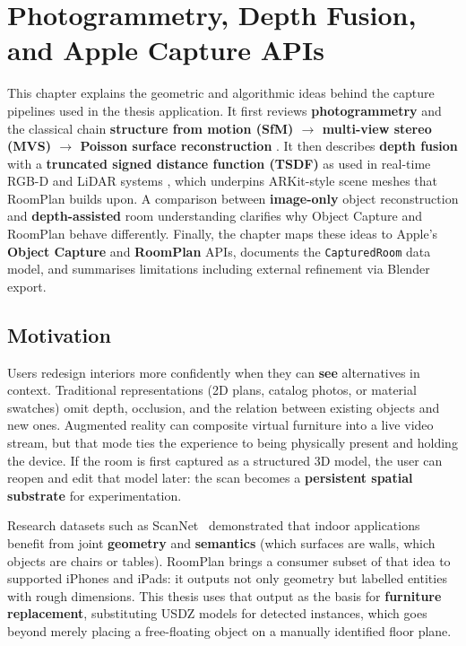 \chapter{Photogrammetry, Depth Fusion, and Apple Capture APIs}
\label{ch:theory1}

This chapter explains the geometric and algorithmic ideas behind the capture pipelines used in the thesis application. It first reviews \textbf{photogrammetry} and the classical chain \textbf{structure from motion (SfM) $\rightarrow$ multi-view stereo (MVS) $\rightarrow$ Poisson surface reconstruction} \cite{luhmann2014photogrammetry,lowe2004sift,furukawa2010pmvs,kazhdan2006poisson}. It then describes \textbf{depth fusion} with a \textbf{truncated signed distance function (TSDF)} as used in real-time RGB-D and LiDAR systems \cite{newcombe2011kinectfusion,whelan2016elasticfusion}, which underpins ARKit-style scene meshes that RoomPlan builds upon. A comparison between \textbf{image-only} object reconstruction and \textbf{depth-assisted} room understanding clarifies why Object Capture and RoomPlan behave differently. Finally, the chapter maps these ideas to Apple's \textbf{Object Capture} and \textbf{RoomPlan} APIs, documents the \texttt{CapturedRoom} data model, and summarises limitations including external refinement via Blender export.

\section{Motivation}
\label{sec:motivation}

Users redesign interiors more confidently when they can \textbf{see} alternatives in context. Traditional representations (2D plans, catalog photos, or material swatches) omit depth, occlusion, and the relation between existing objects and new ones. Augmented reality can composite virtual furniture into a live video stream, but that mode ties the experience to being physically present and holding the device. If the room is first captured as a structured 3D model, the user can reopen and edit that model later: the scan becomes a \textbf{persistent spatial substrate} for experimentation.

Research datasets such as ScanNet~\cite{dai2017scannet} demonstrated that indoor applications benefit from joint \textbf{geometry} and \textbf{semantics} (which surfaces are walls, which objects are chairs or tables). RoomPlan brings a consumer subset of that idea to supported iPhones and iPads: it outputs not only geometry but labelled entities with rough dimensions. This thesis uses that output as the basis for \textbf{furniture replacement}, substituting USDZ models for detected instances, which goes beyond merely placing a free-floating object on a manually identified floor plane.

